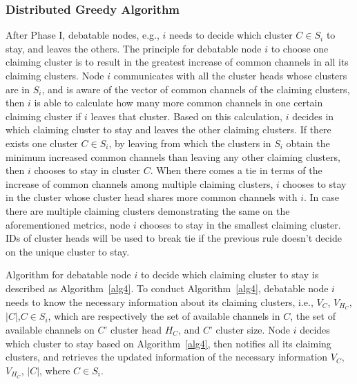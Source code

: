 \documentclass[journal,comsoc]{IEEEtran}
\theoremstyle{mytheoremstyle}
\theoremstyle{mytheoremstyle}
\theoremstyle{mytheoremstyle}
\newcommand{\eg}{e.g., }
\newcommand{\ie}{i.e., }
\begin{document}

\subsubsection{Distributed Greedy Algorithm}
After Phase I, debatable nodes, \eg $i$ needs to decide which cluster $C\in S_i$ to stay, and leaves the others.
The principle for debatable node $i$ to choose one claiming cluster is to result in the greatest increase of common channels in all its claiming clusters.
Node $i$ communicates with all the cluster heads whose clusters are in $S_i$, and is aware of the vector of common channels of the claiming clusters, then $i$ is able to calculate how many more common channels in one certain claiming cluster if $i$ leaves that cluster.
Based on this calculation, $i$ decides in which claiming cluster to stay and leaves the other claiming clusters.
If there exists one cluster $C\in S_i$, by leaving from which the clusters in $S_i$ obtain the minimum increased common channels than leaving any other claiming clusters, then $i$ chooses to stay in cluster $C$.
When there comes a tie in terms of the increase of common channels among multiple claiming clusters, $i$ chooses to stay in the cluster whose cluster head shares more common channels with $i$.
In case there are multiple claiming clusters demonstrating the same on the aforementioned metrics, node $i$ chooses to stay in the smallest claiming cluster.
IDs of cluster heads will be used to break tie if the previous rule doesn't decide on the unique cluster to stay.

Algorithm for debatable node $i$ to decide which claiming cluster to stay is described as Algorithm~\ref{alg4}.
To conduct Algorithm~\ref{alg4}, debatable node $i$ needs to know the necessary information about its claiming clusters, \ie $V_C$, $V_{H_C}$, $|C|$,$C\in S_i$, which are respectively the set of available channels in $C$, the set of available channels on $C$' cluster head $H_C$, and $C$' cluster size.
Node $i$ decides which cluster to stay based on Algorithm~\ref{alg4}, then notifies all its claiming clusters, and retrieves the updated information of the necessary information $V_C$, $V_{H_C}$, $|C|$, where $C\in S_i$.
\end{document}
